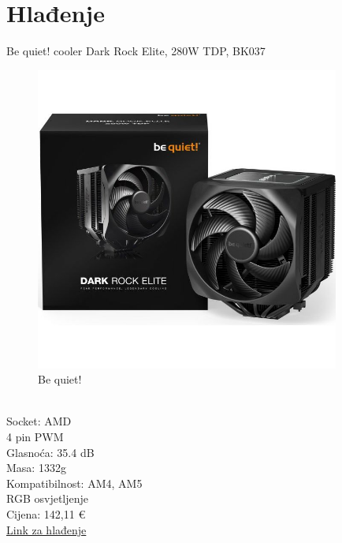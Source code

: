 \documentclass{article}
\begin{document}
\section{Hlađenje}
Be quiet! cooler Dark Rock Elite, 280W TDP, BK037
\begin{figure}[h]
    \includegraphics[width=10cm]{cooler.jpg}
    \caption{Be quiet!}
\end{figure}\\
Socket: AMD\\
4 pin PWM\\
Glasnoća: 35.4 dB\\
Masa: 1332g\\
Kompatibilnost: AM4, AM5\\
RGB osvjetljenje\\
Cijena: 142,11 €\\
\href{https://www.adm.hr/be-quiet-cooler-dark-rock-elite-280w-tdp-bk037/79623/product/}{Link za hlađenje}

\newpage
\end{document}
